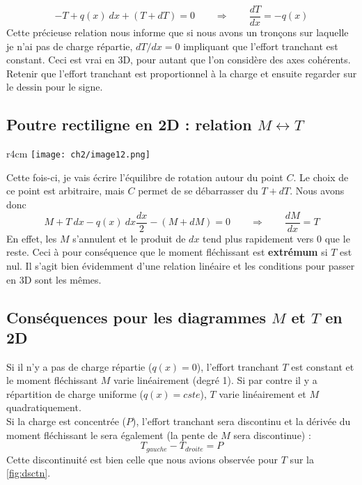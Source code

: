 	\begin{equation}
	-T + q(x)\ dx + (T+dT) = 0\qquad\Longrightarrow \qquad \dfrac{dT}{dx}
	=-q(x)
	\end{equation}
	Cette précieuse relation nous informe que si nous avons un tronçons 
	sur laquelle je n'ai pas de charge répartie, $dT/dx = 0$ impliquant 
	que l'effort tranchant est constant. Ceci est vrai en 3D, pour autant 
	que l'on considère des axes cohérents.\\
	\danger Retenir que l'effort tranchant est proportionnel à la charge 
	et ensuite regarder sur le dessin pour le signe.
	\subsection{Poutre rectiligne en 2D : relation $M \leftrightarrow T$}
	\begin{wrapfigure}[9]{r}{4cm}
	\vspace{-5mm}
	\texttt{[image: ch2/image12.png]}
	\end{wrapfigure}
	Cette fois-ci, je vais écrire l'équilibre de rotation autour du 
	point $C$. Le choix de ce point est arbitraire, mais $C$ permet de 
	se débarrasser du $T+dT$. Nous avons donc
	\begin{equation}
	M + T\ dx - q(x)\ dx \frac{dx}{2} - (M+dM)=0\qquad\Longrightarrow\qquad
	\dfrac{dM}{dx}= T
	\end{equation}
	En effet, les $M$ s'annulent et le produit de $dx$ tend plus rapidement 
	vers 0 que le reste. Ceci à pour conséquence que le moment fléchissant 
	est \textbf{extrémum} si $T$ est nul. Il s'agit bien évidemment d'une 
	relation linéaire et les conditions pour passer en 3D sont les mêmes.
	
	
	\subsection{Conséquences pour les diagrammes $M$ et $T$ en 2D}
	Si il n'y a pas de charge répartie ($q(x)=0$), l'effort tranchant $T$ est 
	constant et le moment fléchissant $M$ varie linéairement (degré 1). Si 
	par contre il y a répartition de charge uniforme ($q(x)=cste$), $T$ varie 
	linéairement et $M$ quadratiquement.\\
	
	Si la charge est concentrée ($P$), l'effort tranchant sera discontinu et la 
	dérivée du moment fléchissant le sera également (la pente de $M$ sera 
	discontinue) :
	\begin{equation}
	T_{gauche} - T_{droite} = P
	\end{equation}
	Cette discontinuité est bien celle que nous avions observée pour $T$ sur 
	la \autoref{fig:dsctn}.\\
	
